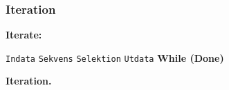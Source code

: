 \documentclass[../main.tex]{subfiles}
\begin{document}
\subsubsection{Iteration}

\begin{algorithm}[H]
\SetAlgoLined


 \textbf{Iterate:} 
 
   \texttt{Indata}\;
   \texttt{Sekvens}\;
   \texttt{Selektion}\;
   \texttt{Utdata}\; 
 \textbf{While (Done)}
 \caption{\textbf{Iteration.}}
 
\end{algorithm}
\end{document}
